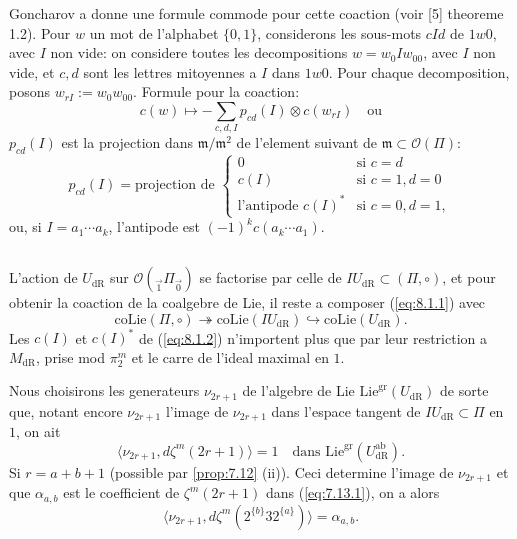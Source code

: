 \documentclass[11pt,a4paper]{article}
\theoremstyle{plain}
\theoremstyle{definition}
\newcommand{\dR}{\mathrm{dR}}
\newcommand{\gr}{\mathrm{gr}}
\newcommand{\coLie}{\mathrm{coLie}}
\newcommand{\ab}{\mathrm{ab}}
\begin{document}
Goncharov a donne une formule commode pour cette coaction (voir [5] theoreme 1.2). Pour $w$ un mot de l'alphabet $\{0,1\}$, considerons les sous-mots $cId$ de $1w0$, avec $I$ non vide: on considere toutes les decompositions $w = w_0 I w_{00}$, avec $I$ non vide, et $c,d$ sont les lettres mitoyennes a $I$ dans $1w0$. Pour chaque decomposition, posons $w_{rI} := w_0 w_{00}$. Formule pour la coaction:
\begin{equation}\label{eq:8.1.1}
c(w) \mapsto -\sum_{c,d,I} p_{cd}(I) \otimes c(w_{rI}) \quad \text{ou}
\end{equation}
$p_{cd}(I)$ est la projection dans $\mathfrak{m}/\mathfrak{m}^2$ de l'element suivant de $\mathfrak{m} \subset \mathcal{O}(\Pi)$:
\begin{equation}\label{eq:8.1.2}
p_{cd}(I) = \text{projection de } \begin{cases} 0 & \text{si } c = d \\ c(I) & \text{si } c = 1, d = 0 \\ \text{l'antipode } c(I)^* & \text{si } c = 0, d = 1, \end{cases}
\end{equation}
ou, si $I = a_1 \cdots a_k$, l'antipode est $(-1)^k c(a_k \cdots a_1)$.

\subsection{}\label{ssec:8.2}

L'action de $U_{\dR}$ sur $\mathcal{O}({}_{\vec{1}}\Pi_{\vec{0}})$ se factorise par celle de $IU_{\dR} \subset (\Pi, \circ)$, et pour obtenir la coaction de la coalgebre de Lie, il reste a composer (\ref{eq:8.1.1}) avec
\[
\coLie(\Pi, \circ) \twoheadrightarrow \coLie(IU_{\dR}) \hookrightarrow \coLie(U_{\dR}).
\]
Les $c(I)$ et $c(I)^*$ de (\ref{eq:8.1.2}) n'importent plus que par leur restriction a $M_{\dR}$, prise mod $\pi_2^m$ et le carre de l'ideal maximal en $1$.

Nous choisirons les generateurs $\nu_{2r+1}$ de l'algebre de Lie $\mathrm{Lie}^{\gr}(U_{\dR})$ de sorte que, notant encore $\nu_{2r+1}$ l'image de $\nu_{2r+1}$ dans l'espace tangent de $IU_{\dR} \subset \Pi$ en $1$, on ait
\[
\langle \nu_{2r+1}, d\zeta^m(2r+1) \rangle = 1 \quad \text{dans } \mathrm{Lie}^{\gr}(U_{\dR}^{\ab}).
\]
Si $r = a+b+1$ (possible par \ref{prop:7.12} (ii)). Ceci determine l'image de $\nu_{2r+1}$ et que $\alpha_{a,b}$ est le coefficient de $\zeta^m(2r+1)$ dans (\ref{eq:7.13.1}), on a alors
\[
\langle \nu_{2r+1}, d\zeta^m(2^{\{b\}} 3 2^{\{a\}}) \rangle = \alpha_{a,b}.
\]
\end{document}
